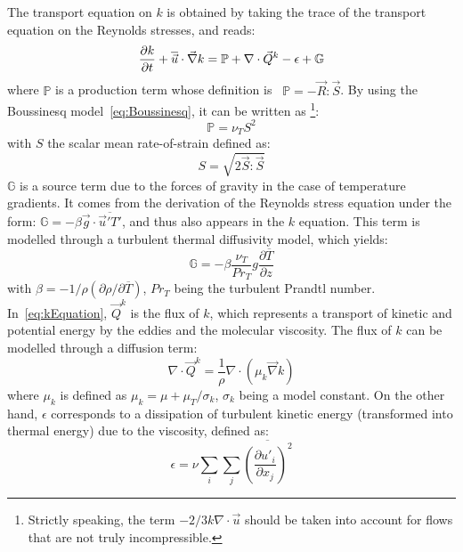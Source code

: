 The transport equation on $k$ is obtained by taking the trace of the transport equation on the Reynolds stresses, and reads:
\begin{equation}\label{eq:kEquation}
  \dfrac{\partial k}{\partial t} +\overline{\vec{u}}\cdot \vec \nabla k= \mathbb P + \nabla \cdot \vec{Q}^k - \epsilon + \mathbb{G}
\end{equation}
where $\mathbb P$ is a production term whose definition is ~\mbox{$\mathbb P=-\vec{R}\!:\!\vec{S}$}.
By using the Boussinesq model~\eqref{eq:Boussinesq}, it can be written as%
\footnote{Strictly speaking, the term $-2/3 k \nabla \cdot \vec u$ should be taken into account for flows that are not truly incompressible.}:
\begin{equation}\label{eq:production}
  \mathbb P = \nu_T S^2
\end{equation}
with $S$ the scalar mean rate-of-strain defined as:
\begin{equation}\label{eq:scalarS}
  S = \sqrt{2\vec{S}:\vec{S}}
\end{equation}
$\mathbb{G}$ is a source term due to the forces of gravity in the case of temperature gradients.
It comes from the derivation of the Reynolds stress equation under the form: $\mathbb G = -\beta\vec{g}\cdot \overline{\vec{u}'T'}$, and thus also appears in the $k$ equation. This term is modelled through a turbulent thermal diffusivity model,
which yields:
\begin{equation}
\mathbb{G}=-\beta\dfrac{\nu_T}{Pr_T}g\dfrac{\partial \overline{T}}{\partial z}%
\end{equation}
with $\beta=-1/\rho(\partial\rho/\partial \overline{T})$, $Pr_T$ being the turbulent
Prandtl number.%
In~\eqref{eq:kEquation}, $\vec{Q}^k$ is the flux of $k$, which represents a transport of
kinetic and potential energy by the eddies and the molecular viscosity.
The flux of $k$ can be modelled through a diffusion term:
\begin{equation}
  \nabla \cdot \vec{Q}^k = \dfrac{1}{\rho}\nabla \cdot \left(\mu_k \vec \nabla k\right)
\end{equation}
where $\mu_k$ is defined as $\mu_k = \mu+\mu_T/\sigma_k$, $\sigma_k$ being a model constant.
On the other hand, $\epsilon$ corresponds to a dissipation of turbulent kinetic energy (transformed into thermal energy) due to the viscosity, defined as:
\begin{equation}
  \epsilon = \nu \sum_i\sum_j\overline{\left(\dfrac{\partial u'_i}{\partial x_j}\right)^2}
\end{equation}
